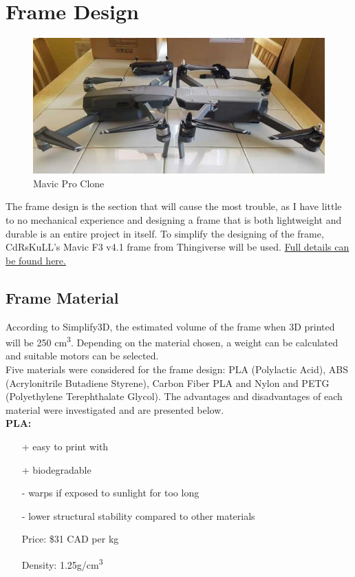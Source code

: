 \documentclass[12pt]{article}
\begin{document}
\section{Frame Design}
\begin{figure}[H]
\caption{Mavic Pro Clone}
\centering
\includegraphics[scale=0.6]{mavic.png}
\end{figure}

The frame design is the section that will cause the most trouble, as I have little to no mechanical experience and designing a frame that is both lightweight and durable is an entire project in itself. To simplify the designing of the frame, CdRsKuLL's Mavic F3 v4.1 frame from Thingiverse will be used. \href{http://diyrc.co.uk/3d-printed-mavic-clone/mavic-clone-stl-files-version-3-0-f3/}{\color{cyan}Full details can be found here.}

\subsection{Frame Material}

According to Simplify3D, the estimated volume of the frame when 3D printed will be 250 cm\textsuperscript{3}. Depending on the material chosen, a weight can be calculated and suitable motors can be selected.
\\

Five materials were considered for the frame design: PLA (Polylactic Acid), ABS (Acrylonitrile Butadiene Styrene), Carbon Fiber PLA and Nylon and PETG (Polyethylene Terephthalate Glycol). The advantages and disadvantages of each material were investigated and are presented below.
\\

\vspace{5mm}
\textbf{PLA:}
\renewcommand{\labelitemi}{\textperiodcentered}
\begin{itemize}
\item[+] easy to print with
\item[+] biodegradable
\item[-] warps if exposed to sunlight for too long
\item[-] lower structural stability compared to other materials
\item[Price:] \$31 CAD per kg 
\item[Density:] 1.25g/cm\textsuperscript{3}
\end{itemize}
\vspace{5mm}
\end{document}
